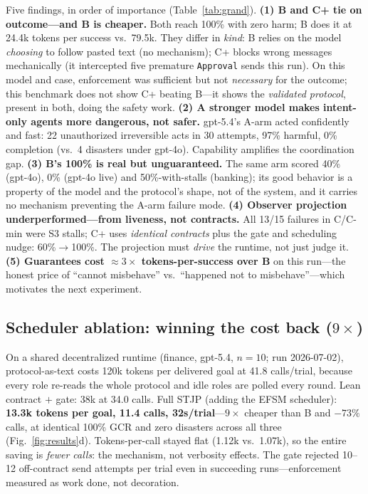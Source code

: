 \documentclass{article}
\newcommand{\stjp}{\textsc{STJP}}
\begin{document}
Five findings, in order of importance (Table~\ref{tab:grand}). \textbf{(1) B and C+ tie on outcome---and B is cheaper.} Both reach 100\% with zero harm; B does it at 24.4k tokens per success vs.\ 79.5k. They differ in \emph{kind}: B relies on the model \emph{choosing} to follow pasted text (no mechanism); C+ blocks wrong messages mechanically (it intercepted five premature \texttt{Approval} sends this run). On this model and case, enforcement was sufficient but not \emph{necessary} for the outcome; this benchmark does not show C+ beating B---it shows the \emph{validated protocol}, present in both, doing the safety work. \textbf{(2) A stronger model makes intent-only agents more dangerous, not safer.} gpt-5.4's A-arm acted confidently and fast: 22 unauthorized irreversible acts in 30 attempts, 97\% harmful, 0\% completion (vs.\ 4 disasters under gpt-4o). Capability amplifies the coordination gap. \textbf{(3) B's 100\% is real but unguaranteed.} The same arm scored 40\% (gpt-4o), 0\% (gpt-4o live) and 50\%-with-stalls (banking); its good behavior is a property of the model and the protocol's shape, not of the system, and it carries no mechanism preventing the A-arm failure mode. \textbf{(4) Observer projection underperformed---from liveness, not contracts.} All 13/15 failures in C/C-min were S3 stalls; C+ uses \emph{identical contracts} plus the gate and scheduling nudge: 60\%$\to$100\%. The projection must \emph{drive} the runtime, not just judge it. \textbf{(5) Guarantees cost $\approx3\times$ tokens-per-success over B} on this run---the honest price of ``cannot misbehave'' vs.\ ``happened not to misbehave''---which motivates the next experiment.

\subsection{Scheduler ablation: winning the cost back ($9\times$)}
On a shared decentralized runtime (finance, gpt-5.4, $n{=}10$; run 2026-07-02), protocol-as-text costs 120k tokens per delivered goal at 41.8 calls/trial, because every role re-reads the whole protocol and idle roles are polled every round. Lean contract $+$ gate: 38k at 34.0 calls. Full \stjp{} (adding the EFSM scheduler): \textbf{13.3k tokens per goal, 11.4 calls, 32s/trial}---$9\times$ cheaper than B and $-73\%$ calls, at identical 100\% GCR and zero disasters across all three (Fig.~\ref{fig:results}d). Tokens-per-call stayed flat (1.12k vs.\ 1.07k), so the entire saving is \emph{fewer calls}: the mechanism, not verbosity effects. The gate rejected 10--12 off-contract send attempts per trial even in succeeding runs---enforcement measured as work done, not decoration.
\end{document}
